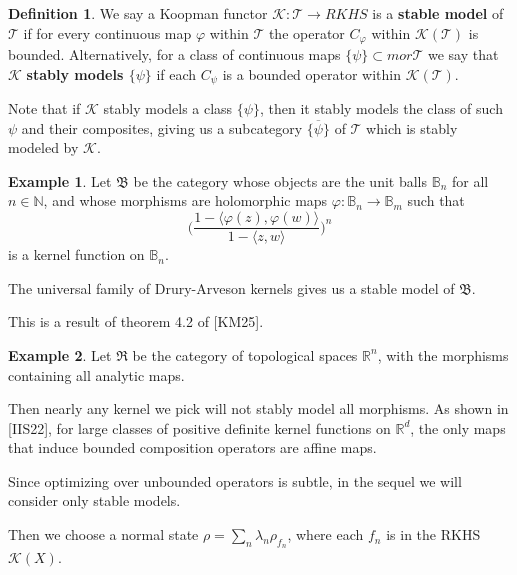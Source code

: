 \documentclass[12pt]{amsart}
\theoremstyle{definition}
\newtheorem{definition}[theorem]{Definition}
\newtheorem{example}{Example}[theorem]
\numberwithin{equation}{section}
\begin{document}
\begin{definition}
    We say a Koopman functor $\mathcal K: \mathcal T \rightarrow RKHS$ is a \textbf{stable model} of $\mathcal T$ if for every continuous map $\varphi$ within $\mathcal T$ the operator $C_\varphi$ within $\mathcal K(\mathcal T)$ is bounded.
    Alternatively, for a class of continuous maps $\{\psi\} \subset mor\mathcal T$ we say that $\mathcal K$ \textbf{stably models $\{\psi\}$} if each $C_\psi$ is a bounded operator within $\mathcal K(\mathcal T)$. 

    Note that if $\mathcal K$ stably models a class $\{\psi\}$, then it stably models the class of such $\psi$ and their composites, giving us a subcategory $\overline{\{\psi\}} $ of $\mathcal T$ which is stably modeled by $\mathcal K$. 
\end{definition}
\begin{example}
    Let $\mathfrak B$ be the category whose objects are the unit balls $\mathbb B_n$ for all $n\in \mathbb N$, and whose morphisms are holomorphic maps $\varphi: \mathbb B_n \rightarrow \mathbb B_m$ such that \[\biggl (\frac{1-\langle \varphi(z), \varphi(w)\rangle}{1-\langle z, w\rangle}\biggr)^n\] is a kernel function on $\mathbb B_n$. 

    The universal family of Drury-Arveson kernels gives us a stable model of $\mathfrak B$. 

    This is a result of theorem 4.2 of [KM25]. 
\end{example}
\begin{example}
    Let $\mathfrak R$ be the category of topological spaces $\mathbb R^n$, with the morphisms containing all analytic maps. 

    Then nearly any kernel we pick will not stably model all morphisms. As shown in [IIS22], for large classes of positive definite kernel functions on $\mathbb R^d$, the only maps that induce bounded composition operators are affine maps. 
\end{example}

Since optimizing over unbounded operators is subtle, in the sequel we will consider only stable models. 

Then we choose a normal state $\rho = \sum_n\lambda_n\rho_{f_n}$, where each $f_n$ is in the RKHS $ \mathcal K(X)$. 
\end{document}
